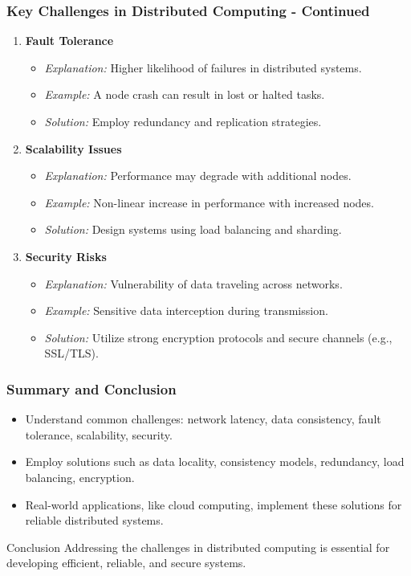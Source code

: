 \documentclass[aspectratio=169]{beamer}
\begin{document}
\begin{frame}[fragile]
    \frametitle{Key Challenges in Distributed Computing - Continued}
    \begin{enumerate}[resume]
        \item \textbf{Fault Tolerance}
            \begin{itemize}
                \item \textit{Explanation:} Higher likelihood of failures in distributed systems.
                \item \textit{Example:} A node crash can result in lost or halted tasks.
                \item \textit{Solution:} Employ redundancy and replication strategies.
            \end{itemize}

        \item \textbf{Scalability Issues}
            \begin{itemize}
                \item \textit{Explanation:} Performance may degrade with additional nodes.
                \item \textit{Example:} Non-linear increase in performance with increased nodes.
                \item \textit{Solution:} Design systems using load balancing and sharding.
            \end{itemize}

        \item \textbf{Security Risks}
            \begin{itemize}
                \item \textit{Explanation:} Vulnerability of data traveling across networks.
                \item \textit{Example:} Sensitive data interception during transmission.
                \item \textit{Solution:} Utilize strong encryption protocols and secure channels (e.g., SSL/TLS).
            \end{itemize}
    \end{enumerate}
\end{frame}

\begin{frame}[fragile]
    \frametitle{Summary and Conclusion}
    \begin{itemize}
        \item Understand common challenges: network latency, data consistency, fault tolerance, scalability, security.
        \item Employ solutions such as data locality, consistency models, redundancy, load balancing, encryption.
        \item Real-world applications, like cloud computing, implement these solutions for reliable distributed systems.
    \end{itemize}
    \begin{block}{Conclusion}
        Addressing the challenges in distributed computing is essential for developing efficient, reliable, and secure systems.
    \end{block}
\end{frame}
\end{document}

